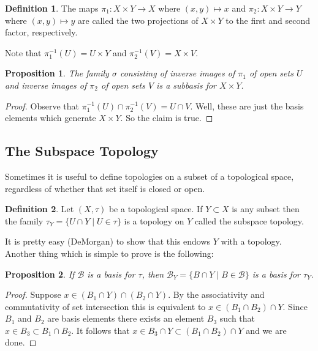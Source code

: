 \documentclass[12pt]{article}
\theoremstyle{plain}
\newtheorem{proposition}{Proposition}
\theoremstyle{definition}
\newtheorem{definition}{Definition}
\begin{document}
\begin{definition}
The maps $\pi_1:X \times Y \to X$ where $(x, y) \mapsto x$ and $\pi_2: X \times Y \to Y$ where $(x, y) \mapsto y$ are called the two projections of $X \times Y$ to the first and second factor, respectively.
\end{definition}

Note that $\pi_1^{-1}(U) = U \times Y$ and $\pi_2^{-1}(V) = X \times V$. 

\begin{proposition}
The family $\sigma$ consisting of inverse images of $\pi_1$ of open sets $U$ and inverse images of $\pi_2$ of open sets $V$ is a subbasis for $X \times Y$.
\end{proposition}

\begin{proof}
Observe that $\pi_1^{-1}(U) \cap \pi_2^{-1}(V) = U \cap V$. Well, these are just the basis elements which generate $X \times Y$. So the claim is true.
\end{proof}

\subsection{The Subspace Topology}

Sometimes it is useful to define topologies on a subset of a topological space, regardless of whether that set itself is closed or open.

\begin{definition}
Let $(X, \tau)$ be a topological space. If $Y \subset X$ is any subset then the family $\tau_Y = \{U \cap Y \mid U \in \tau\}$ is a topology on $Y$ called the subspace topology.
\end{definition}

It is pretty easy (DeMorgan) to show that this endows $Y$ with a topology. Another thing which is simple to prove is the following:

\begin{proposition}
If $\mathcal{B}$ is a basis for $\tau$, then $\mathcal{B}_Y = \{B \cap Y \mid B \in \mathcal{B}\}$ is a basis for $\tau_Y$.
\end{proposition}

\begin{proof}
Suppose $x \in (B_1 \cap Y) \cap (B_2 \cap Y)$. By the associativity and commutativity of set intersection this is equivalent to $x \in (B_1 \cap B_2) \cap Y$. Since $B_1$ and $B_2$ are basis elements there exists an element $B_3$ such that $x \in B_3 \subset B_1 \cap B_2$. It follows that $x \in B_3 \cap Y \subset (B_1 \cap B_2) \cap Y$ and we are done.
\end{proof}
\end{document}
